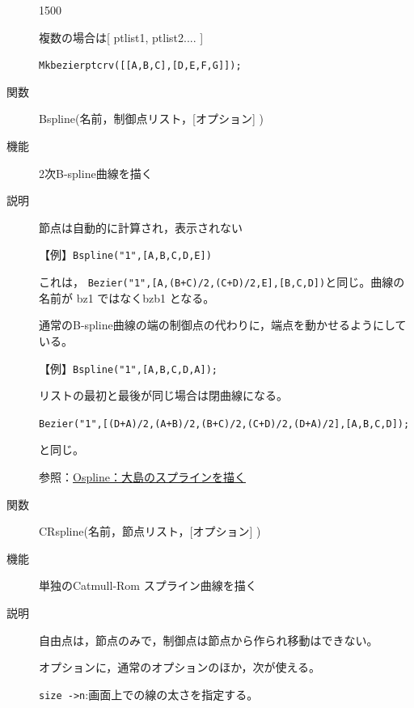 \documentclass[papersize,a4paper,12pt,uplatex]{jsarticle}
\begin{document}
\begin{description}
\begin{layer}{150}{0}
\end{layer}

複数の場合は[ ptlist1, ptlist2.... ]

\verb|Mkbezierptcrv([[A,B,C],[D,E,F,G]]);|

\vspace{40mm}

 \vspace{\baselineskip}
\hypertarget{bspline}{}
\item[関数]Bspline(名前，制御点リスト，[オプション] )
\item[機能]2次B-spline曲線を描く
\item[説明]節点は自動的に計算され，表示されない

 \vspace{\baselineskip}
【例】\verb|Bspline("1",[A,B,C,D,E])|

これは， \verb|Bezier("1",[A,(B+C)/2,(C+D)/2,E],[B,C,D])|と同じ。曲線の名前が bz1 ではなくbzb1 となる。

通常のB-spline曲線の端の制御点の代わりに，端点を動かせるようにしている。

\begin{center} \end{center}

【例】\verb|Bspline("1",[A,B,C,D,A]);|

リストの最初と最後が同じ場合は閉曲線になる。

 \verb|Bezier("1",[(D+A)/2,(A+B)/2,(B+C)/2,(C+D)/2,(D+A)/2],[A,B,C,D]);| 
 
 と同じ。

\begin{center} \end{center}

参照：\hyperlink{ospline}{Ospline：大島のスプラインを描く} 

\vspace{\baselineskip}
\hypertarget{crspline}{}
\item[関数]CRspline(名前，節点リスト，[オプション] )
\item[機能]単独のCatmull-Rom スプライン曲線を描く
\item[説明]
自由点は，節点のみで，制御点は節点から作られ移動はできない。

オプションに，通常のオプションのほか，次が使える。

\verb|size ->n|:画面上での線の太さを指定する。


\end{description}
\end{document}
